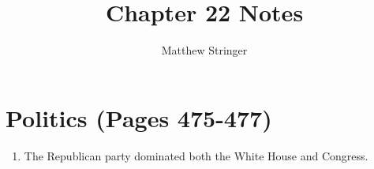 \documentclass[12pt]{article} %
\title{Chapter 22 Notes} %
\author{Matthew Stringer} %
\begin{document}
\maketitle
\tableofcontents
\newpage

\section*{Politics (Pages 475-477)}
\begin{enumerate}
	\item The Republican party dominated both the White House and Congress.
\end{enumerate}
\end{document}
